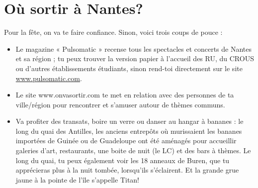 \section{Où sortir à Nantes?}\trad
Pour la fête, on va te faire confiance.
Sinon, voici trois coups de pouce :
\begin{itemize}
  \item Le magazine « Pulsomatic » recense tous les spectacles et concerts de Nantes et sa région ; tu peux trouver la version papier à l'accueil des RU, du CROUS ou d'autres établissements étudiants, sinon rend-toi directement sur le site \url{www.pulsomatic.com}.
  \item Le site www.onvasortir.com te met en relation avec des personnes de ta ville/région pour rencontrer et s'amuser autour de thèmes communs.
  \item Va profiter des transats, boire un verre ou danser au hangar à bananes : le long du quai des Antilles, les anciens entrepôts où murissaient les bananes importées de Guinée ou de Guadeloupe ont été aménagés pour accueillir galeries d'art, restaurants, une boite de nuit (le LC) et des bars à thèmes.
Le long du quai, tu peux également voir les 18 anneaux de Buren, que tu apprécieras plus à la nuit tombée, lorsqu'ils s'éclairent.
Et la grande grue jaune à la pointe de l'île s'appelle Titan!
\end{itemize}

